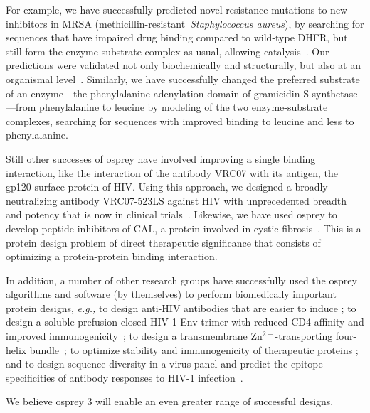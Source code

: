 For example, we have successfully predicted novel resistance mutations to new inhibitors in MRSA (methicillin-resistant~\textit{Staphylococcus aureus}), by searching for sequences that have impaired drug binding compared to wild-type DHFR, but still form the enzyme-substrate complex as usual, allowing catalysis~\cite{DHFR-PNAS,DHFR-PNAS2}.  Our predictions were validated not only biochemically and structurally, but also at an organismal level~\cite{DHFR-PNAS2, mimb_resistance}.  Similarly, we have successfully changed the preferred substrate of an enzyme---the phenylalanine adenylation domain of gramicidin S synthetase---from phenylalanine to leucine by modeling of the two enzyme-substrate complexes, searching for sequences with improved binding to leucine and less to phenylalanine.  

Still other successes of {\sc osprey} have involved improving a single binding interaction, like the interaction of the antibody VRC07 with its antigen, the gp120 surface protein of HIV.  Using this approach, we designed a broadly neutralizing antibody VRC07-523LS against HIV with unprecedented breadth and potency that is now in clinical trials~\cite{VRC07_enhance,clinical605}.  Likewise, we have used {\sc osprey} to develop peptide inhibitors of CAL, a protein involved in cystic fibrosis~\cite{CFTR}.  This is a protein design problem of direct therapeutic significance that consists of optimizing a protein-protein binding interaction.  

In addition, a number of other research groups have successfully used the {\sc osprey} algorithms and software (by themselves) to perform biomedically important protein designs, {\em e.g.,} to design anti-HIV antibodies that are easier to induce \cite{Georgiev:2014aa}; to design a soluble prefusion closed HIV-1-Env trimer with reduced CD4 affinity and improved immunogenicity~\cite{Gwo-yu17}; to design a transmembrane Zn$^{2+}$-transporting four-helix bundle~\cite{Joh14}; to optimize stability and immunogenicity of therapeutic proteins \cite{Parker:2013aa,Salvat:2015aa,Zhao:2015aa}; and to design sequence diversity in a virus panel and predict the epitope specificities of antibody responses to HIV-1 infection~\cite{polyclonal17}.

We believe {\sc osprey} 3 will enable an even greater range of successful designs.  
